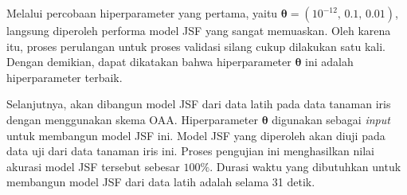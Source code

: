 \noindent Melalui percobaan hiperparameter yang pertama, yaitu $\boldsymbol{\theta} = (10^{-12} \text{, } \allowbreak \num{0,1} \text{, } \allowbreak \num{0,01})$, langsung diperoleh performa model JSF yang sangat memuaskan. Oleh karena itu, proses perulangan untuk proses validasi silang cukup dilakukan satu kali. Dengan demikian, dapat dikatakan bahwa hiperparameter $\boldsymbol{\theta}$ ini adalah hiperparameter terbaik.

\noindent Selanjutnya, akan dibangun model JSF dari data latih pada data tanaman iris dengan menggunakan skema OAA. Hiperparameter $\boldsymbol{\theta}$ digunakan sebagai \emph{input} untuk membangun model JSF ini. Model JSF yang diperoleh akan diuji pada data uji dari data tanaman iris ini. Proses pengujian ini menghasilkan nilai akurasi model JSF tersebut sebesar $100\%$. Durasi waktu yang dibutuhkan untuk membangun model JSF dari data latih adalah selama 31 detik.

